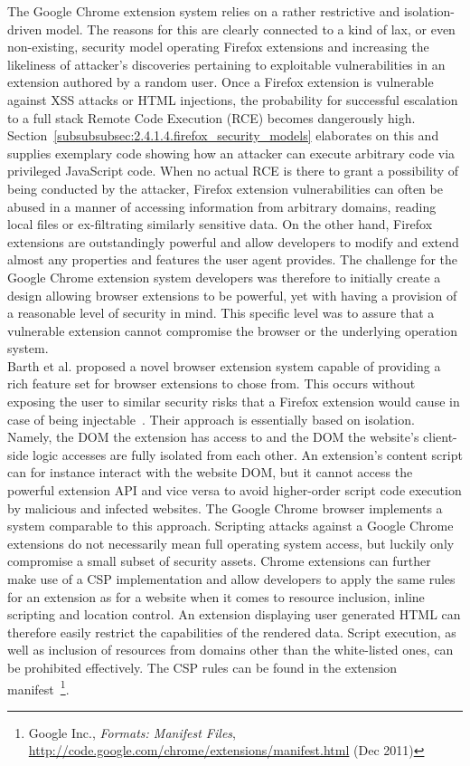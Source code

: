       The Google Chrome extension system relies on a rather restrictive and isolation-driven model. The reasons for this are clearly connected to a kind of lax, or even non-existing, security model operating Firefox extensions and increasing the likeliness of attacker's discoveries pertaining to exploitable vulnerabilities in an extension authored by a random user. Once a Firefox extension is vulnerable against XSS attacks or HTML injections, the probability for successful escalation to a full stack Remote Code Execution (RCE) becomes dangerously high. Section~\ref{subsubsubsec:2.4.1.4.firefox_security_models} elaborates on this and supplies exemplary code showing how an attacker can execute arbitrary code via privileged JavaScript code. When no actual RCE is there to grant a possibility of being conducted by the attacker, Firefox extension vulnerabilities can often be abused in a manner of accessing information from arbitrary domains, reading local files or ex-filtrating similarly sensitive data. On the 
other hand, Firefox extensions are outstandingly powerful and allow developers to modify and extend almost any properties and features the user agent provides. The challenge for the Google Chrome extension system developers was therefore to initially create a design allowing browser extensions to be powerful, yet with having a provision of a reasonable level of security in mind. This specific level was to assure that a vulnerable extension cannot compromise the browser or the underlying operation system.\\

      Barth et al. proposed a novel browser extension system capable of providing a rich feature set for browser extensions to chose from. This occurs without exposing the user to similar security risks that a Firefox extension would cause in case of being injectable~\cite{barth2010protecting}. Their approach is essentially based on isolation. Namely, the DOM the extension has access to and the DOM the website's client-side logic accesses are fully isolated from each other. An extension's content script can for instance interact with the website DOM, but it cannot access the powerful extension API and vice versa to avoid higher-order script code execution by malicious and infected websites. The Google Chrome browser implements a system comparable to this approach. Scripting attacks against a Google Chrome extensions do not necessarily mean full operating system access, but luckily only compromise a small subset of security assets. Chrome extensions can further make use of a CSP implementation and allow 
developers to apply the same rules for an extension as for a website when it comes to resource inclusion, inline scripting and location control. An extension displaying user generated HTML can therefore easily restrict the capabilities of the rendered data. Script execution, as well as inclusion of resources from domains other than the white-listed ones, can be prohibited effectively. The CSP rules can be found in the extension manifest~\footnote{Google Inc., \textit{Formats: Manifest Files}, \url{http://code.google.com/chrome/extensions/manifest.html} (Dec 2011)}.

